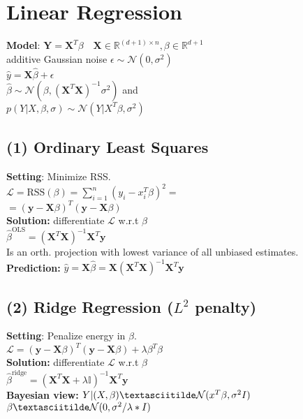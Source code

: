 \section*{Linear Regression}
\textbf{Model}:
$\mathbf{Y}=\mathbf{X}^T\beta \quad \mathbf{X}\in\mathbb{R}^{(d+1)\times n}, \beta \in \mathbb{R}^{d+1}$\\
additive Gaussian noise $\epsilon \sim \mathcal{N}(0,\sigma^2)$\\
$\hat{y}=\mathbf{X}\hat{\beta}+\epsilon$\\
$\hat{\beta} \sim \mathcal{N}(\beta, (\mathbf{X}^T\mathbf{X})^{-1}\sigma^2) $ and\\
$p(Y|X,\beta, \sigma) \sim \mathcal{N}(Y|X^T\beta, \sigma^2)$



\subsection*{(1) Ordinary Least Squares}
\textbf{Setting}: Minimize RSS.\\
$\mathcal{L} = \text{RSS}(\beta)=\sum_{i=1}^n(y_i-x_i^T\beta)^2=$\\
$=(\mathbf{y}-\mathbf{X}\beta)^T(\mathbf{y}-\mathbf{X}\beta)$\\
\textbf{Solution:} differentiate $\mathcal{L}$ w.r.t $\beta$\\
$\hat{\beta}^\text{OLS} = (\mathbf{X}^T\mathbf{X})^{-1}\mathbf{X}^{T}\mathbf{y}$\\
Is an orth. projection with lowest variance of all unbiased estimates.\\
\textbf{Prediction:} $\hat{y}{=}\mathbf{X}\hat{\beta}{=}\mathbf{X}(\mathbf{X}^T\mathbf{X})^{-1}\mathbf{X}^{T}\mathbf{y}$


\subsection*{(2) Ridge Regression ($L^2$ penalty)}
\textbf{Setting}: Penalize energy in $\beta$.\\
$\mathcal{L} = (\mathbf{y}-\mathbf{X}\beta)^T(\mathbf{y}-\mathbf{X}\beta)+\lambda\beta^T\beta$\\
\textbf{Solution:} differentiate $\mathcal{L}$ w.r.t $\beta$\\
$\hat{\beta}^\text{ridge} = (\mathbf{X}^T\mathbf{X}+\lambda\mathbb{I})^{-1}\mathbf{X}^{T}\mathbf{y}$ \\
\textbf{Bayesian view:} $Y|(X, \beta) \textasciitilde \mathcal{N}(x^T\beta, \sigma^2 I)$\\
$ \beta \textasciitilde \mathcal{N}(0, \sigma^2/\lambda*I)$


